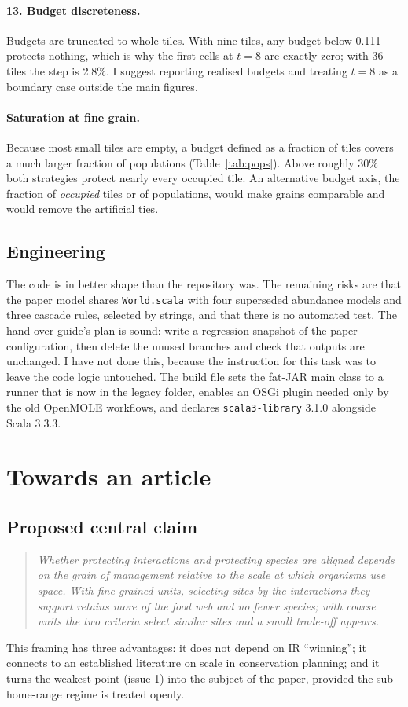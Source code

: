 \documentclass[11pt,a4paper]{article}
\newcommand{\code}[1]{\texttt{\small #1}}
\begin{document}
\paragraph{13. Budget discreteness.} Budgets are truncated to whole tiles. With nine tiles, any budget
below 0.111 protects nothing, which is why the first cells at $t=8$ are exactly zero; with 36 tiles the step
is 2.8\%. I suggest reporting realised budgets and treating $t=8$ as a boundary case outside the main
figures.

\paragraph{Saturation at fine grain.} Because most small tiles are empty, a budget defined as a fraction of
tiles covers a much larger fraction of populations (Table~\ref{tab:pops}). Above roughly 30\% both strategies
protect nearly every occupied tile. An alternative budget axis, the fraction of \emph{occupied} tiles or of
populations, would make grains comparable and would remove the artificial ties.

\subsection{Engineering}
The code is in better shape than the repository was. The remaining risks are that the paper model shares
\code{World.scala} with four superseded abundance models and three cascade rules, selected by strings, and
that there is no automated test. The hand-over guide's plan is sound: write a regression snapshot of the
paper configuration, then delete the unused branches and check that outputs are unchanged. I have not done
this, because the instruction for this task was to leave the code logic untouched. The build file sets the
fat-JAR main class to a runner that is now in the legacy folder, enables an OSGi plugin needed only by the
old OpenMOLE workflows, and declares \code{scala3-library} 3.1.0 alongside Scala 3.3.3.

\section{Towards an article}

\subsection{Proposed central claim}
\begin{quote}
\emph{Whether protecting interactions and protecting species are aligned depends on the grain of
management relative to the scale at which organisms use space. With fine-grained units, selecting sites by
the interactions they support retains more of the food web and no fewer species; with coarse units the two
criteria select similar sites and a small trade-off appears.}
\end{quote}
This framing has three advantages: it does not depend on IR ``winning''; it connects to an established
literature on scale in conservation planning; and it turns the weakest point (issue 1) into the subject of
the paper, provided the sub-home-range regime is treated openly.
\end{document}

